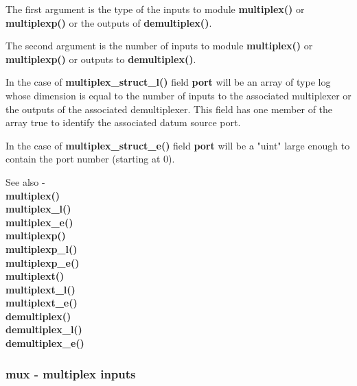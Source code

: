             The first argument is the type of the inputs to module {\bf
            multiplex()} or {\bf multiplexp()} or the outputs of {\bf
            demultiplex()}.

            The second argument is the number of inputs to module {\bf
            multiplex()} or {\bf multiplexp()} or outputs to {\bf
            demultiplex()}.

            In the case of {\bf multiplex\_struct\_l()} field {\bf port} will be
            an array of type log whose dimension is equal to the number of
            inputs to the associated multiplexer or the outputs of the
            associated demultiplexer. This field has one member of the array
            true to identify the associated datum source port.

            In the case of {\bf multiplex\_struct\_e()} field {\bf port} will be
            a "uint" large enough to contain the port number (starting at 0).

            See also - \\
            {\bf multiplex()}  \\
            {\bf multiplex\_l()}  \\
            {\bf multiplex\_e()}  \\
            {\bf multiplexp()}  \\
            {\bf multiplexp\_l()}  \\
            {\bf multiplexp\_e()}  \\
            {\bf multiplext()}  \\
            {\bf multiplext\_l()}  \\
            {\bf multiplext\_e()}  \\
            {\bf demultiplex()}  \\
            {\bf demultiplex\_l()}  \\
            {\bf demultiplex\_e()} 


        \subsubsection{mux - multiplex inputs}\label{sec:lfmux}

